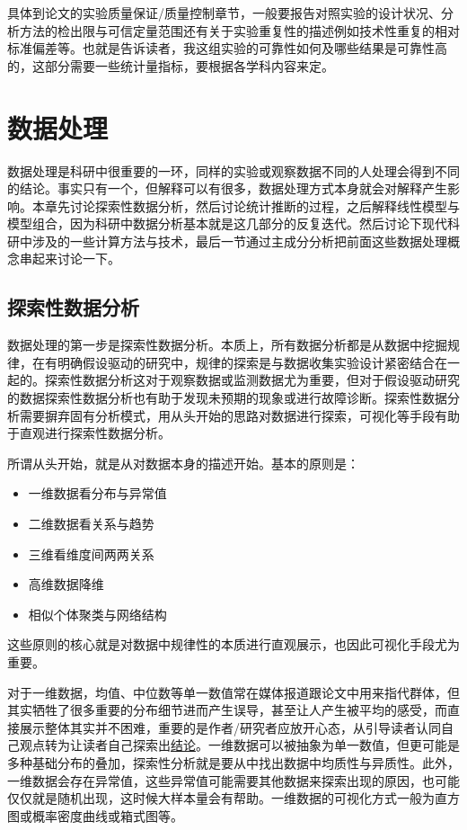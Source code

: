 \documentclass[]{tufte-book}
\providecommand{\tightlist}{%
  \setlength{\itemsep}{0pt}\setlength{\parskip}{0pt}}
\begin{document}
具体到论文的实验质量保证/质量控制章节，一般要报告对照实验的设计状况、分析方法的检出限与可信定量范围还有关于实验重复性的描述例如技术性重复的相对标准偏差等。也就是告诉读者，我这组实验的可靠性如何及哪些结果是可靠性高的，这部分需要一些统计量指标，要根据各学科内容来定。

\hypertarget{data}{%
\chapter{数据处理}\label{data}}

数据处理是科研中很重要的一环，同样的实验或观察数据不同的人处理会得到不同的结论。事实只有一个，但解释可以有很多，数据处理方式本身就会对解释产生影响。本章先讨论探索性数据分析，然后讨论统计推断的过程，之后解释线性模型与模型组合，因为科研中数据分析基本就是这几部分的反复迭代。然后讨论下现代科研中涉及的一些计算方法与技术，最后一节通过主成分分析把前面这些数据处理概念串起来讨论一下。

\hypertarget{ux63a2ux7d22ux6027ux6570ux636eux5206ux6790}{%
\section{探索性数据分析}\label{ux63a2ux7d22ux6027ux6570ux636eux5206ux6790}}

数据处理的第一步是探索性数据分析。本质上，所有数据分析都是从数据中挖掘规律，在有明确假设驱动的研究中，规律的探索是与数据收集实验设计紧密结合在一起的。探索性数据分析这对于观察数据或监测数据尤为重要，但对于假设驱动研究的数据探索性数据分析也有助于发现未预期的现象或进行故障诊断。探索性数据分析需要摒弃固有分析模式，用从头开始的思路对数据进行探索，可视化等手段有助于直观进行探索性数据分析。

所谓从头开始，就是从对数据本身的描述开始。基本的原则是：

\begin{itemize}
\tightlist
\item
  一维数据看分布与异常值
\item
  二维数据看关系与趋势
\item
  三维看维度间两两关系
\item
  高维数据降维
\item
  相似个体聚类与网络结构
\end{itemize}

这些原则的核心就是对数据中规律性的本质进行直观展示，也因此可视化手段尤为重要。

对于一维数据，均值、中位数等单一数值常在媒体报道跟论文中用来指代群体，但其实牺牲了很多重要的分布细节进而产生误导，甚至让人产生被平均的感受，而直接展示整体其实并不困难，重要的是作者/研究者应放开心态，从引导读者认同自己观点转为让读者自己探索出\href{http://flowingdata.com/2017/07/07/small-summary-stats/}{结论}。一维数据可以被抽象为单一数值，但更可能是多种基础分布的叠加，探索性分析就是要从中找出数据中均质性与异质性。此外，一维数据会存在异常值，这些异常值可能需要其他数据来探索出现的原因，也可能仅仅就是随机出现，这时候大样本量会有帮助。一维数据的可视化方式一般为直方图或概率密度曲线或箱式图等。
\end{document}
